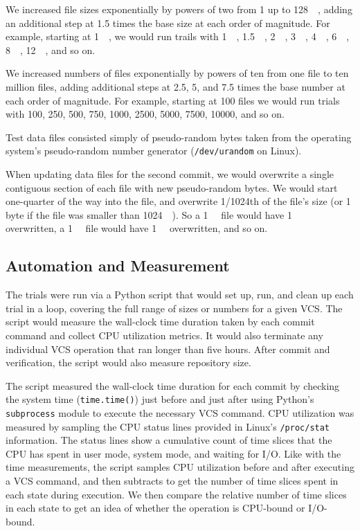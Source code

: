 We increased file sizes exponentially by powers of two from \SI{1}{\byte} up to
\SI{128}{\gibi\byte}, adding an additional step at \num{1.5} times the base size
at each order of magnitude. For example, starting at \SI{1}{\mebi\byte}, we
would run trails with \SI{1}{\mebi\byte}, \SI{1.5}{\mebi\byte},
\SI{2}{\mebi\byte}, \SI{3}{\mebi\byte}, \SI{4}{\mebi\byte}, \SI{6}{\mebi\byte},
\SI{8}{\mebi\byte}, \SI{12}{\mebi\byte}, and so on.

We increased numbers of files exponentially by powers of ten from one file to
ten million files, adding additional steps at \num{2.5}, \num{5}, and \num{7.5}
times the base number at each order of magnitude. For example, starting at
\num{100} files we would run trials with \num{100}, \num{250}, \num{500},
\num{750}, \num{1000}, \num{2500}, \num{5000}, \num{7500}, \num{10000}, and so
on.

Test data files consisted simply of pseudo-random bytes taken from the operating
system's pseudo-random number generator (\lstinline{/dev/urandom} on Linux).

When updating data files for the second commit, we would overwrite a single
contiguous section of each file with new pseudo-random bytes. We would start
one-quarter of the way into the file, and overwrite \num{1/1024}th of the file's
size (or 1 byte if the file was smaller than \SI{1024}{\kibi\byte}). So a
\SI{1}{\mebi\byte} file would have \SI{1}{\kibi\byte} overwritten, a
\SI{1}{\gibi\byte} file would have \SI{1}{\mebi\byte} overwritten, and so on.


\subsection{Automation and Measurement}

The trials were run via a Python script that would set up, run, and clean up
each trial in a loop, covering the full range of sizes or numbers for a given
VCS. The script would measure the wall-clock time duration taken by each commit
command and collect CPU utilization metrics. It would also terminate any
individual VCS operation that ran longer than five hours. After commit and
verification, the script would also measure repository size.

The script measured the wall-clock time duration for each commit by checking the
system time (\lstinline{time.time()}) just before and just after using Python's
\lstinline{subprocess} module to execute the necessary VCS command. CPU
utilization was measured by sampling the CPU status lines provided in Linux's
\lstinline{/proc/stat} information. The status lines show a cumulative count of
time slices that the CPU has spent in user mode, system mode, and waiting for
I/O. Like with the time measurements, the script samples CPU utilization before
and after executing a VCS command, and then subtracts to get the number of time
slices spent in each state during execution. We then compare the relative number
of time slices in each state to get an idea of whether the operation is
CPU-bound or I/O-bound.

